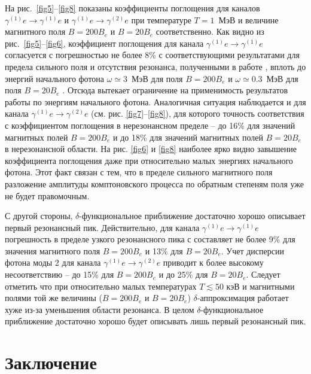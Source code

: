 \documentclass[cp1251%
               ]{jetp} %
\begin{document}
На рис.~\ref{fig5}--\ref{fig8} показаны коэффициенты поглощения для каналов $\gamma^{(1)}e\to\gamma^{(1)}e$ и $\gamma^{(1)}e\to\gamma^{(2)}e$ при температуре $T=1 $~МэВ и величине магнитного поля $B=200B_e$ и $B=20B_e$ соответственно. Как видно из рис.~\ref{fig5}--\ref{fig6}, коэффициент поглощения для канала $\gamma^{(1)}e\to\gamma^{(1)}e$ согласуется с погрешностью не более 8\% с соответствующими результатами для предела сильного поля и отсутствия резонанса, полученными в работе \cite{Chistyakov:2009}, вплоть до энергий начального фотона  $\omega\simeq3$~МэВ для поля $B=200B_e$ и  $\omega\simeq0.3$~МэВ для поля $B=20B_e$ . Отсюда вытекает ограничение на применимость результатов работы \cite{Chistyakov:2009} по энергиям начального фотона. Аналогичная ситуация наблюдается и для канала $\gamma^{(1)}e\to\gamma^{(2)}e$ (см. рис. \ref{fig7}--\ref{fig8}), для которого точность соответствия с коэффициентом поглощения в нерезонансном пределе -- до 16\% для значений магнитных полей $B=200B_e$ и до 18\% для значений магнитных полей $B=20B_e$ в нерезонансной области.  На рис. \ref{fig6} и \ref{fig8} наиболее ярко видно завышение коэффициента поглощения даже при относительно малых энергиях начального фотона. Этот факт связан с тем, что в пределе сильного магнитного поля разложение амплитуды комптоновского процесса по обратным степеням поля уже не будет правомочным.

С  другой стороны, $\delta$-функциональное приближение достаточно хорошо описывает первый резонансный пик. Действительно, для канала $\gamma^{(1)}e\to\gamma^{(1)}e$ погрешность в пределе узкого резонансного пика с составляет не более 9\% для значения магнитного поля $B=200B_e$ и 13\% для $B=20 B_e$. Учет дисперсии фотона моды 2 для канала $\gamma^{(1)}e\to\gamma^{(2)}e$ приводит к более высокому несоответствию -- до 15\% для $B=200B_e$ и до 25\% для $B=20B_e$.
Следует отметить   что при относительно малых температурах $T\lesssim50$ кэВ и магнитными полями той же величины ($B = 200 B_e$ и $B = 20 B_e$) $\delta$-аппроксимация работает хуже из-за уменьшения области резонанса. В целом $\delta$-функциональное приближение достаточно хорошо будет описывать лишь первый резонансный пик.






\section{Заключение}
\end{document}
